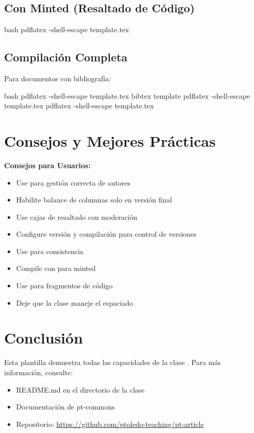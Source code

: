 \documentclass{pt-article}
\begin{document}
\subsection{Con Minted (Resaltado de Código)}

\begin{ptprintcode}{bash}
pdflatex -shell-escape template.tex
\end{ptprintcode}

\subsection{Compilación Completa}

Para documentos con bibliografía:

\begin{ptprintcode}{bash}
pdflatex -shell-escape template.tex
bibtex template
pdflatex -shell-escape template.tex
pdflatex -shell-escape template.tex
\end{ptprintcode}

\section{Consejos y Mejores Prácticas}

\begin{highlightbox}
\textbf{Consejos para Usuarios:}
\begin{itemize}
    \item Use  para gestión correcta de autores
    \item Habilite balance de columnas solo en versión final
    \item Use cajas de resaltado con moderación
    \item Configure versión y compilación para control de versiones
    \item Use  para consistencia
    \item Compile con  para minted
    \item Use  para fragmentos de código
    \item Deje que la clase maneje el espaciado
\end{itemize}
\end{highlightbox}

\section{Conclusión}

Esta plantilla demuestra todas las capacidades de la clase .
Para más información, consulte:

\begin{itemize}
    \item README.md en el directorio de la clase
    \item Documentación de pt-commons
    \item Repositorio: \url{https://github.com/ptoledo-teaching/pt-article}
\end{itemize}

% 
% 
\end{document}
